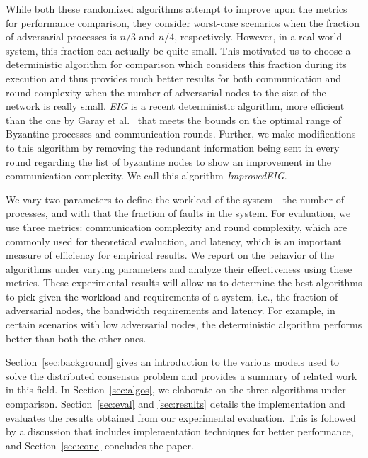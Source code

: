 While both these randomized algorithms attempt to improve upon the metrics for
performance comparison, they consider worst-case scenarios when the fraction of
adversarial processes is $n/3$ and $n/4$, respectively. However, in
a real-world system, this fraction can actually be quite small. This
motivated us to choose a deterministic algorithm for comparison which considers
this fraction during its execution and thus provides much
better results for both communication and round complexity when the number of
adversarial nodes to the size of the network is really small. \textit{EIG} is
a recent deterministic algorithm, more efficient than the one by Garay et
al.~\cite{GarayM98} that meets the bounds on the optimal range of Byzantine
processes and communication rounds. Further, we make modifications
to this algorithm by removing the redundant information being sent in every round
regarding the list of byzantine nodes to show an improvement in the
communication complexity. We call this algorithm \textit{ImprovedEIG}.


We vary two parameters to define the workload of the system---the number of
processes, and with that the fraction of faults in the system.  For evaluation,
we use three metrics: communication complexity and round complexity, which are
commonly used for theoretical evaluation, and latency, which is an important
measure of efficiency for empirical results. We report on the behavior of the
algorithms under varying parameters and analyze their effectiveness using
these metrics.  These experimental results will allow us to determine the best
algorithms to pick given the workload and requirements of a system,
i.e., the fraction of adversarial nodes, the bandwidth requirements and
latency. For example, in certain scenarios with low adversarial nodes, the
deterministic algorithm performs better than both the other ones.

Section~\ref{sec:background} gives an introduction to the various models used
to solve the distributed consensus problem and provides a summary of related
work in this field. In Section~\ref{sec:algos}, we elaborate on the three
algorithms under comparison. Section~\ref{sec:eval} and \ref{sec:results}
details the implementation and evaluates the results obtained from our
experimental evaluation. This is followed by a discussion that includes
implementation techniques for better performance, and Section~\ref{sec:conc}
concludes the paper.
